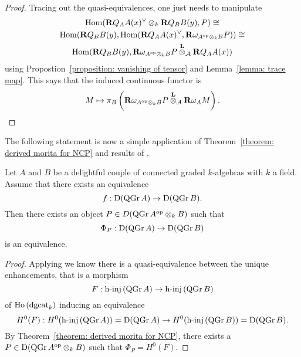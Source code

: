 \begin{proof}
  Tracing out the quasi-equivalences, one just needs to manipulate 
  \begin{gather*}
    \operatorname{Hom} (\mathbf{R}Q_A A(x)^\vee \otimes_k \mathbf{R}Q_B B(y), P) \cong\\
    \operatorname{Hom} ( \mathbf{R}Q_B B(y) , \operatorname{Hom}( \mathbf{R}Q_A A(x)^\vee, \mathbf{R}\omega_{A^{\operatorname{op}} \otimes_k B} P))
    \cong
    \\ \operatorname{Hom} ( \mathbf{R}Q_B B(y) , \mathbf{R}\omega_{A^{\operatorname{op}} \otimes_k B} P \overset{\mathbf{L}}{\otimes}_{\mathcal A} \mathbf{R}Q_A A(x) ) 
  \end{gather*}
  using Propostion~\ref{proposition: vanishing of tensor} and Lemma~\ref{lemma: trace map}. This says that the induced continuous functor is
  \begin{displaymath}
    M \mapsto \pi_B \left( \mathbf{R}\omega_{A^{\operatorname{op}} \otimes_k B} P \overset{\mathbf{L}}{\otimes}_{\mathcal A} \mathbf{R}\omega_A M \right). 
  \end{displaymath}
\end{proof}

The following statement is now a simple application of Theorem~\ref{theorem: derived morita for NCP} and results of \textcite{Lunts-Orlov}. 

\begin{corollary} \label{corollary: NCP morita}
  Let \(A\) and \(B\) be a delightful couple of connected graded \(k\)-algebras with \(k\) a field. Assume that there exists an equivalence
  \begin{displaymath}
    f : \mathrm{D} (\operatorname{QGr}A) \to \mathrm{D} (\operatorname{QGr}B).
  \end{displaymath}
  Then there exists an object \(P \in D ( \operatorname{QGr}A^{\operatorname{op}} \otimes_k B )\) such that 
  \begin{displaymath}
    \Phi_P : \mathrm{D} ( \operatorname{QGr}A) \to \mathrm{D} (\operatorname{QGr}B )
  \end{displaymath}
  is an equivalence.
\end{corollary}

\begin{proof}
  Applying \textcite[Theorem 1]{Lunts-Orlov} we know there is a quasi-equivalence between the unique enhancements, that is a morphism
  \[F : \operatorname{h-inj}\left(\operatorname{QGr}A\right) \to \operatorname{h-inj}\left(\operatorname{QGr}B\right)\]
  of \(\operatorname{Ho}\left(\operatorname{dgcat}_k\right)\) inducing an equivalence
  \begin{displaymath}
    H^0(F) : H^0(\operatorname{h-inj}\left( \operatorname{QGr}A \right)) = \mathrm{D}(\operatorname{QGr}A) \to H^0(\operatorname{h-inj}\left( \operatorname{QGr}B \right)) = \mathrm{D}(\operatorname{QGr}B).
  \end{displaymath}
  By Theorem~\ref{theorem: derived morita for NCP}, there exists a \(P \in \mathrm{D}(\operatorname{QGr}A^{\operatorname{op}} \otimes_k B)\) such that \(\Phi_P = H^0(F)\). 
\end{proof}

